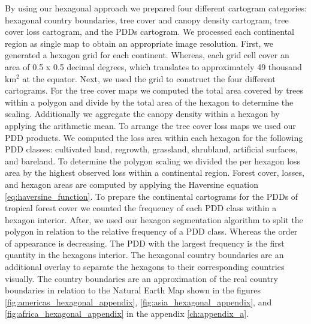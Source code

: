 		By using our hexagonal approach we prepared four different cartogram categories: hexagonal country boundaries, tree cover and canopy density cartogram, tree cover loss cartogram, and the \acp{PDD} cartogram. We processed each continental region as single map to obtain an appropriate image resolution. First, we generated a hexagon grid for each continent. Whereas, each grid cell cover an area of 0.5 x 0.5 decimal degrees, which translates to approximately 49 thousand km$^2$ at the equator. Next, we used the grid to construct the four different cartograms. For the tree cover maps we computed the total area covered by trees within a polygon and divide by the total area of the hexagon to determine the scaling. Additionally we aggregate the canopy density within a hexagon by applying the arithmetic mean. To arrange the tree cover loss maps we used our \ac{PDD} products. We computed the loss area within each hexagon for the following \ac{PDD} classes: cultivated land, regrowth, grassland, shrubland, artificial surfaces, and bareland. To determine the polygon scaling we divided the per hexagon loss area by the highest observed loss within a continental region. Forest cover, losses, and hexagon areas are computed by applying the Haversine equation \ref{eq:haversine_function}. To prepare the continental cartograms for the \acp{PDD} of tropical forest cover we counted the frequency of each \ac{PDD} class within a hexagon interior. After, we used our hexagon segmentation algorithm to split the polygon in relation to the relative frequency of a \ac{PDD} class. Whereas the order of appearance is decreasing. The \ac{PDD} with the largest frequency is the first quantity in the hexagons interior. The hexagonal country boundaries are an additional overlay to separate the hexagons to their corresponding countries visually. The country boundaries are an approximation of the real country boundaries in relation to the Natural Earth Map shown in the figures \ref{fig:americas_hexagonal_appendix}, \ref{fig:asia_hexagonal_appendix}, and \ref{fig:africa_hexagonal_appendix} in the appendix \ref{ch:appendix_a}.  